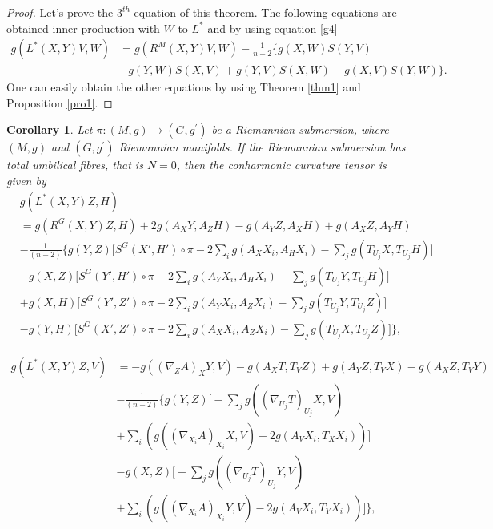 \documentclass{birkjour}
\newtheorem{corollary}[theorem]{Corollary}
\theoremstyle{definition}
\theoremstyle{remark}
\numberwithin{equation}{section}
\begin{document}
\begin{proof}
	Let's prove the $3^{th}$ equation of this theorem. The following equations are obtained inner production with $W$ to $L^*$ and by using equation \eqref{g4}
	\begin{align*}
		g(L^*(X,Y)V,W)&=g(R^M(X,Y)V,W)-\frac{1}{n-2} \{g(X,W)S(Y,V) \\
		&-g(Y,W)S(X,V)+g(Y,V)S(X,W)-g(X,V)S(Y,W)\}. \nonumber
	\end{align*}
	One can easily obtain the other equations by using Theorem \ref{thm1} and Proposition \ref{pro1}.
\end{proof}
\begin{corollary}
Let $\pi: (M, g) \to(G, g^\prime)$ be a Riemannian submersion, where $(M, g)$ and $(G, g^\prime)$ Riemannian manifolds. If the Riemannian submersion has total umbilical fibres, that  is $N = 0$,  then the conharmonic curvature tensor is given by
	\begin{align*}
		&g(L^* (X,Y)Z, H)\\
		&= g(R^G (X,Y)Z, H) +2 g (A_X Y, A_Z H) - g(A_Y Z, A_X H) + g(A_X Z, A_Y H) \\
		&- \frac{1}{(n-2)} \Bigg\{g(Y,Z) \bigg[S^G (X',H') \circ \pi
		-2 \sum_{i} g(A_X X_i, A_H X_i)- \sum_{j}g(T_{U_j}X, T_{U_j}H)  \bigg] \\
		&-g(X,Z) \bigg[S^G (Y',H') \circ \pi
		-2 \sum_{i} g(A_Y X_i, A_H X_i)- \sum_{j}g(T_{U_j}Y, T_{U_j}H)  \bigg] \\
		&+g(X, H) \bigg[S^G (Y',Z') \circ \pi
		- 2 \sum_{i} g(A_Y X_i, A_Z X_i) - \sum_{j} g(T_{U_j}Y, T_{U_j}Z) \Bigg] \\
		&-g(Y,H) \bigg[S^G (X',Z') \circ \pi
		-2 \sum_{i} g(A_X X_i, A_Z X_i)- \sum_{j}g(T_{U_j}X, T_{U_j}Z)  \bigg] \Bigg\},
	\end{align*}
	
	\begin{align*}
		g(L^* (X,Y)Z, V) &=-g((\nabla_Z A)_X Y,V)\!-\!g(A_X T, T_V Z) \!+\! g(A_Y Z, T_V X)\!- \!g(A_X Z, T_V Y) \\
		&- \frac{1}{(n-2)} \Bigg\{g(Y, Z) \bigg[
		-\sum_{j} g((\nabla_{U_j} T)_{U_j} X, V) \\
		&+\sum_{i}\left(g((\nabla_{X_i}A)_{X_i} X,V )- 2 g (A_V X_i, T_X X_i) \right) \bigg] \\
		&  -g(X,Z) \bigg[-\sum_{j} g((\nabla_{U_j} T)_{U_j} Y, V) \\
		&+ \sum_{i}\left(g((\nabla_{X_i}A)_{X_i} Y,V  ) - 2 g (A_V X_i, T_Y X_i) \right) \bigg] \Bigg\},
	\end{align*}
	

\end{corollary}
\end{document}
